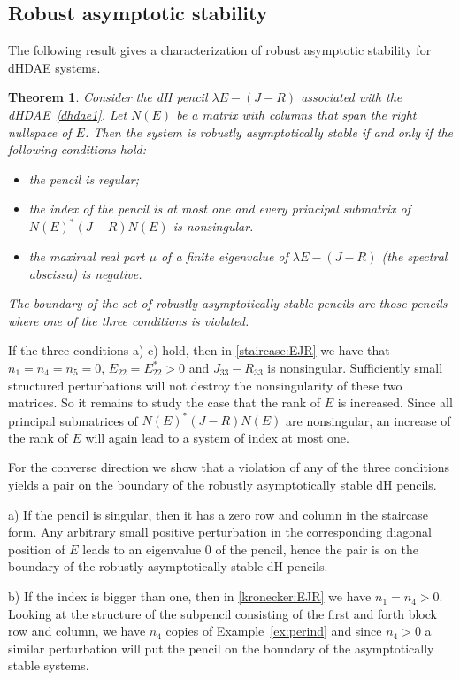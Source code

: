 \documentclass[11pt]{article}
\newtheorem{theorem}{Theorem}
\begin{document}
\subsection{Robust asymptotic stability}\label{sec:robasystab}
The following result gives a characterization of robust asymptotic stability for dHDAE systems.
%
\begin{theorem}\label{thm:stabledh}
    Consider the  dH
    pencil $\lambda E-(J-R)$ associated with the dHDAE~\eqref{dhdae1}. Let $N(E)$ be a matrix with columns that span the right nullspace of $E$. Then the system is robustly asymptotically stable if and only if the following conditions hold:
    \begin{itemize}
        \item [a)] the pencil is regular;
        \item [b)] the index of the pencil is at most one and every principal submatrix of  $N(E)^*(J-R)N(E)$ is nonsingular.
        \item [c)] the maximal real part $\mu$ of a finite eigenvalue of $\lambda E-(J-R)$ (the spectral abscissa) is negative.
    \end{itemize}
    The boundary of the set of robustly asymptotically stable pencils are those pencils where one of the three conditions is violated.
\end{theorem}
\proof
If the three conditions a)-c) hold, then in \eqref{staircase:EJR} we have that $n_1=n_4=n_5=0$, $E_{22}=E_{22}^*>0$ and $J_{33}-R_{33}$ is nonsingular. Sufficiently small structured perturbations will not destroy the nonsingularity of these two matrices. So it remains to study the case that the rank of $E$ is increased. Since all principal submatrices of $N(E)^*(J-R)N(E)$ are nonsingular, an increase of the rank of $E$ will again lead to a system of index at most one.

For the converse direction we show that a violation of any of the three conditions yields a pair on  the boundary of the robustly asymptotically stable dH pencils.

a) If the pencil is singular, then it has
a zero row and column in the staircase form. Any arbitrary small positive perturbation in the corresponding
diagonal position of $E$ leads to an eigenvalue $0$ of the pencil, hence the pair is on the boundary of the robustly asymptotically stable dH pencils.

b) If the index is bigger than  one, then in \eqref{kronecker:EJR} we have $n_1=n_4>0$. Looking at the structure of the subpencil consisting  of the first and forth block row and column, we have $n_4$ copies of
Example~\ref{ex:perind} and since $n_4>0$ a similar perturbation  will put the pencil on the boundary of the asymptotically stable systems.
\end{document}
